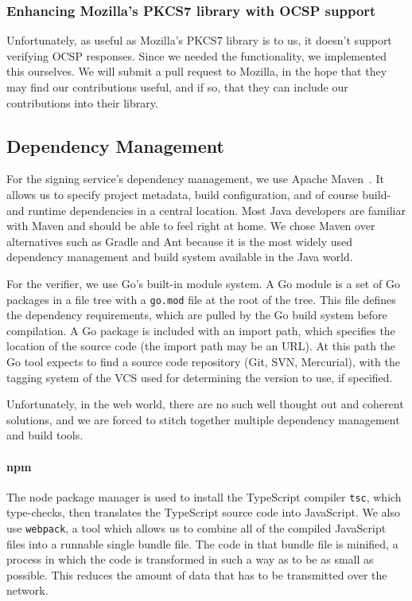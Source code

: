 \subsubsection{Enhancing Mozilla's PKCS7 library with OCSP support}
Unfortunately, as useful as Mozilla's \gls{PKCS7} library is to us,
it doesn't support verifying \gls{OCSP} responses.
Since we needed the functionality,
we implemented this ourselves.
We will submit a pull request to Mozilla,
in the hope that they may find our contributions useful,
and if so, that they can include our contributions into their library.

\subsection{Dependency Management}\label{subsec:dependency-management}
For the signing service's dependency management,
we use Apache Maven~\cite{mvn}.
It allows us to specify project metadata,
build configuration,
and of course build- and runtime dependencies in a central location.
Most Java developers are familiar with Maven and should be able to feel right at home.
We chose Maven over alternatives such as Gradle and Ant because it is the most widely used dependency management and build system available in the Java world.

For the verifier,
we use Go's built-in module system.
A Go module is a set of Go packages in a file tree with a \texttt{go.mod} file at the root of the tree.
This file defines the dependency requirements,
which are pulled by the Go build system before compilation.
A Go package is included with an import path,
which specifies the location of the source code (the import path may be an \gls{URL}).
At this path the Go tool expects to find a source code repository (Git, SVN, Mercurial),
with the tagging system of the \gls{VCS} used for determining the version to use, if specified.

Unfortunately, in the web world, there are no such well thought out and coherent solutions,
and we are forced to stitch together multiple dependency management and build tools.
\paragraph{npm} The node package manager is used to install the TypeScript compiler \texttt{tsc},
which type-checks, then translates the TypeScript source code into JavaScript.
We also use \texttt{webpack},
a tool which allows us to combine all of the compiled JavaScript files into a runnable single bundle file.
The code in that bundle file is minified,
a process in which the code is transformed in such a way as to be as small as possible.
This reduces the amount of data that has to be transmitted over the network.

